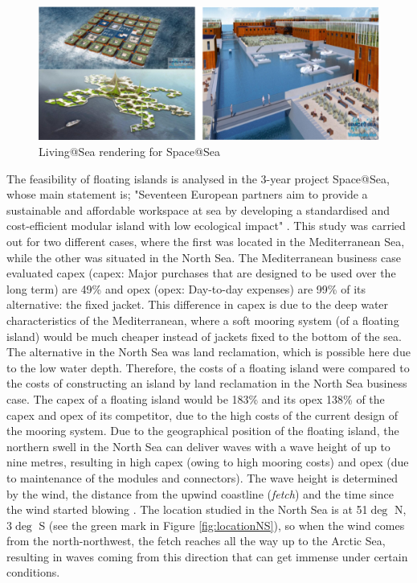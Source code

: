 \begin{figure}[h]
    \centering
    \includegraphics[width=\linewidth]{figures/Literature_Introduction/space@sea_renders.PNG}
    \caption{Living@Sea rendering for Space@Sea \parencite{businessCase_S@S_D1.1}}
    \label{fig:my_label}
\end{figure}

The feasibility of floating islands is analysed in the 3-year project Space@Sea, whose main statement is; "Seventeen European partners aim to provide a sustainable and affordable workspace at sea by developing a standardised and cost-efficient modular island with low ecological impact" \parencite{businessCase_S@S_D1.1}. This study was carried out for two different cases, where the first was located in the Mediterranean Sea, while the other was situated in the North Sea. The Mediterranean business case evaluated \acrshort{capex} (\acrlong{capex}: Major purchases that are designed to be used over the long term) are 49\% and \acrshort{opex} (\acrlong{opex}: Day-to-day expenses) are 99\% of its alternative: the fixed jacket. This difference in \acrshort{capex} is due to the deep water characteristics of the Mediterranean, where a soft mooring system (of a floating island) would be much cheaper instead of jackets fixed to the bottom of the sea. The alternative in the North Sea was land reclamation, which is possible here due to the low water depth. Therefore, the costs of a floating island were compared to the costs of constructing an island by land reclamation in the North Sea business case. The \acrshort{capex} of a floating island would be 183\% and its \acrshort{opex} 138\% of the \acrshort{capex} and \acrshort{opex} of its competitor, due to the high costs of the current design of the mooring system. Due to the geographical position of the floating island, the northern swell in the North Sea can deliver waves with a wave height of up to nine metres, resulting in high \acrshort{capex} (owing to high mooring costs) and \acrshort{opex} (due to maintenance of the modules and connectors). The wave height is determined by the wind, the distance from the upwind coastline (\textit{fetch}) and the time since the wind started blowing \parencite{Holthuijsen2007}. The location studied in the North Sea is at 51$\deg$ N, 3$\deg$ S (see the green mark in Figure \ref{fig:locationNS}), so when the wind comes from the north-northwest, the fetch reaches all the way up to the Arctic Sea, resulting in waves coming from this direction that can get immense under certain conditions.

